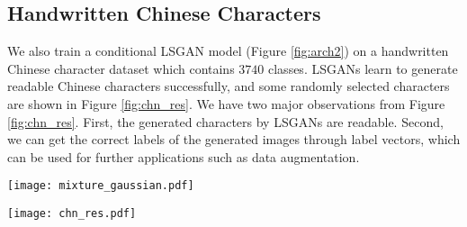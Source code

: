 \documentclass{article} %
\begin{document}


\subsection{Handwritten Chinese Characters}
We also train a conditional LSGAN model (Figure \ref{fig:arch2}) on a handwritten Chinese character dataset which contains $3740$ classes. LSGANs learn to generate readable Chinese characters successfully, and some randomly selected characters are shown in Figure \ref{fig:chn_res}. We have two major observations from Figure \ref{fig:chn_res}. First, the generated characters by LSGANs are readable. Second, we can get the correct labels of the generated images through label vectors, which can be used for further applications such as data augmentation. 

\begin{figure*}[t]
\centering
 \texttt{[image: mixture\_gaussian.pdf]}
\caption{
 Dynamic results of Gaussian kernel estimation for LSGANs and regular GANs. The final column shows the real data distribution. 
}
\label{fig:gaussian}

\end{figure*}
\begin{figure*}[t]
\centering
 \texttt{[image: chn\_res.pdf]}
\caption{
Generated images of handwritten Chinese characters by LSGANs. For row $1$ and row $2$, the images in the same column belong to the same class of characters. Row $3$ and row $4$ are also with this condition. The generated characters are readable.
}
\label{fig:chn_res}
\end{figure*}
\end{document}
